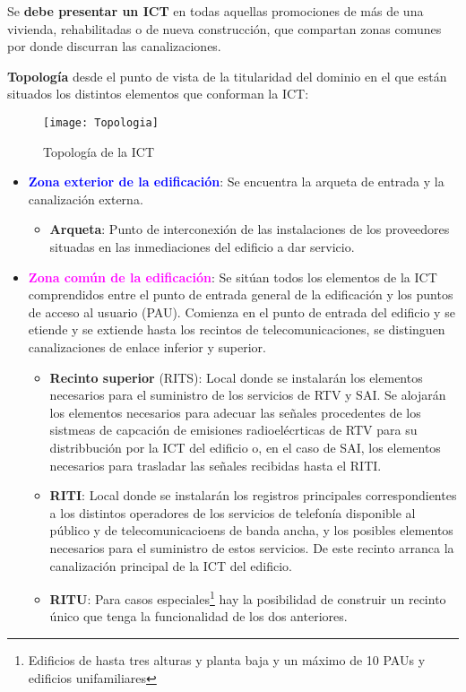 \documentclass[10pt,portrait, twocolumn]{article}
\begin{document}
\quad Se \textbf{debe presentar un ICT} en todas aquellas promociones de más de una vivienda, rehabilitadas o de nueva construcción, que compartan zonas comunes por donde discurran las canalizaciones.

\textbf{Topología} desde el punto de vista de la titularidad del dominio en el que están situados los distintos elementos que conforman la ICT:

\begin{figure}[!ht]
	\centering
     \texttt{[image: Topologia]}
      \caption{Topología de la ICT}
      \label{fig:ONT}
  \end{figure}


	\begin{itemize}
		\item \textbf{\textcolor{blue}{Zona exterior de la edificación}}: Se encuentra la arqueta de entrada y la canalización externa.
			\begin{itemize}
				\item \textbf{Arqueta}: Punto de interconexión de las instalaciones de los proveedores situadas en las inmediaciones del edificio a dar servicio.
			\end{itemize}
		\item \textbf{\textcolor{magenta}{Zona común de la edificación}}: Se sitúan todos los elementos de la ICT comprendidos entre el punto de entrada general de la edificación y los puntos de acceso al usuario (PAU). Comienza en el punto de entrada del edificio y se etiende y se extiende hasta los recintos de telecomunicaciones, se distinguen canalizaciones de enlace inferior y superior.
			\begin{itemize}
				\item \textbf{Recinto superior} (RITS): Local donde se instalarán los elementos necesarios para el suministro de los servicios de RTV y SAI. Se alojarán los elementos necesarios para adecuar las señales procedentes de los sistmeas de capcación de emisiones radioelécrticas de RTV para su distribbución por la ICT del edificio o, en el caso de SAI, los elementos necesarios para trasladar las señales recibidas hasta el RITI.
				\item \textbf{RITI}: Local donde se instalarán los registros principales correspondientes a los distintos operadores de los servicios de telefonía disponible al público y de telecomunicacioens de banda ancha, y los posibles elementos necesarios para el suministro de estos servicios. De este recinto arranca la canalización principal de la ICT del edificio.
				\item \textbf{RITU}: Para casos especiales\footnote{Edificios de hasta tres alturas y planta baja y un máximo de 10 PAUs y edificios unifamiliares} hay la posibilidad de construir un recinto único que tenga la funcionalidad de los dos anteriores.
			\end{itemize}
		

\end{itemize}
\end{document}
